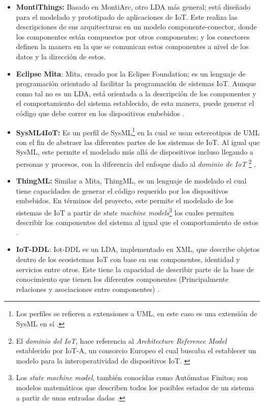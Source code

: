 \begin{itemize}
    \item \textbf{MontiThings:} Basado en MontiArc, otro LDA más general; está diseñado para el modelado y prototipado de aplicaciones de IoT. Este realiza las descripciones de sus arquitecturas en un modelo componente-conector, donde los componentes están compuestos por otros componentes; y los conectores definen la manera en la que se comunican estos componentes a nivel de los datos y la dirección de estos. \cite{MontiThings, MontiThingsRepo}
    \item \textbf{Eclipse Mita}: Mita, creado por la Eclipse Foundation; es un lenguaje de programación orientado al facilitar la programación de sistemas IoT. Aunque como tal no es un LDA, está orientada a la descripción de los componentes y el comportamiento del sistema establecido, de esta manera, puede generar el código que debe correr en los dispositivos embebidos \cite{Mita}. 
    \item \textbf{SysML4IoT:} Es un perfil de SysML\footnote{Los perfiles se refieren a extensiones a UML, en este caso es una extensión de SysML en sí \cite{Charles2007}.} en la cual se usan estereotipos de UML con el fin de abstraer las diferentes partes de los sistemas de IoT. Al igual que SysML, este permite el modelado más allá de dispositivos incluso llegando a personas y procesos, con la diferencia del enfoque dado al \textit{dominio de IoT} \footnote{El \textit{dominio del IoT}, hace referencia al \textit{Architecture Reference Model} establecido por IoT-A, un consorcio Europeo el cual buscaba el establecer un modelo para la interoperatividad de dispositivos IoT. \cite{IoTA2014}} \cite{SysML4IoT2016}.
    \item \textbf{ThingML:} Similar a Mita, ThingML, es un lenguaje de modelado el cual tiene capacidades de generar el código requerido por los dispositivos embebidos. En términos del proyecto, este permite el modelado de los sistemas de IoT a partir de \textit{state machine models}\footnote{Los \textit{state machine model}, también conocidas como Autómatas Finitos; son modelos matemáticos que describen todos los posibles estados de un sistema a partir de unas entradas dadas \cite{StateMachine2023}. } los cuales permiten describir los componentes del sistema al igual que el comportamiento de estos \cite{ThingML2016}.
    \item \textbf{IoT-DDL}: Iot-DDL es un LDA, implementado en XML, que describe objetos dentro de los ecosistemas IoT con base en sus componentes, identidad y servicios entre otros. Este tiene la capacidad de describir parte de la base de conocimiento que tienen los diferentes componentes (Principalmente relaciones y asociaciones entre componentes) \cite{Ahmed2018}.
\end{itemize}

